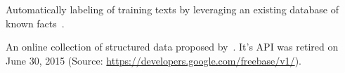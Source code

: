 
{%
  Automatically labeling of training texts by leveraging an existing database of known facts~\citep{reschke2014event}.
}

{%
  An online collection of structured data proposed by~\citep{bollacker2008freebase}.
  It's API was retired on June 30, 2015 (Source: \url{https://developers.google.com/freebase/v1/}).
}


